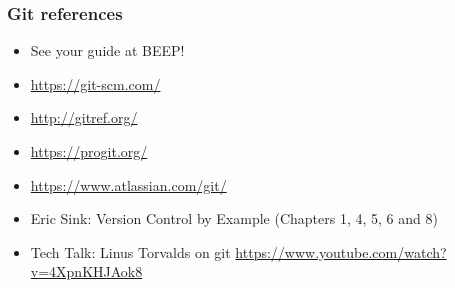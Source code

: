 \documentclass{beamer}
\begin{document}
\begin{frame}
\frametitle{Git references}

\begin{itemize}
\item See your guide at BEEP!
\item \url{https://git-scm.com/}
\item \url{http://gitref.org/}
\item \url{https://progit.org/}
\item \url{https://www.atlassian.com/git/}
\item Eric Sink: Version Control by Example (Chapters 1, 4, 5, 6 and
  8)
\item Tech Talk: Linus Torvalds on git
\url{https://www.youtube.com/watch?v=4XpnKHJAok8}

\end{itemize}

\end{frame}
\end{document}
